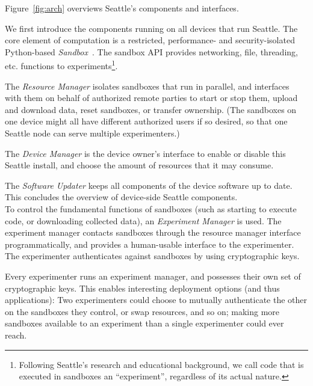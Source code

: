 Figure~\ref{fig:arch} overviews Seattle's components and interfaces.

We first introduce the components running on all devices that
run Seattle.
The core element of computation is a restricted,
performance- and security-isolated Python-based
\textit{Sandbox}~\cite{RepySandbox,li2015fence}.
The sandbox \gls{API} provides
networking, file, threading, etc. functions to
experiments\footnote{
Following Seattle's research and educational background, we
call code that is executed in sandboxes an ``experiment'',
regardless of its actual nature.}.

The \textit{Resource Manager} isolates %
sandboxes that run in
parallel, and interfaces with them on behalf of authorized remote
parties to start or stop them, upload and download data, reset
sandboxes, or transfer ownership. (The sandboxes on one
device might all have different authorized users if so desired,
so that one Seattle node can serve multiple experimenters.)

The \textit{Device Manager} %
is the device owner's interface to enable or disable this Seattle
install, and choose the amount of resources that it may consume.

The \textit{Software Updater} keeps all components of the
device software up to date. This concludes the overview of
device-side Seattle components.
\\

To control the fundamental functions of sandboxes (such as
starting to execute code, or downloading collected data),
an \textit{Experiment Manager} %
is used. The experiment manager contacts sandboxes through the
resource manager interface programmatically, and provides a
human-usable interface to the experimenter. The experimenter
authenticates against sandboxes by using cryptographic keys.

Every experimenter runs an experiment manager, and possesses
their own set of cryptographic keys. This enables interesting
deployment options (and thus applications):
Two experimenters could choose to mutually authenticate the
other on the sandboxes they control, or swap resources, and
so on; making more sandboxes available to an experiment than
a single experimenter could ever reach.
\\

